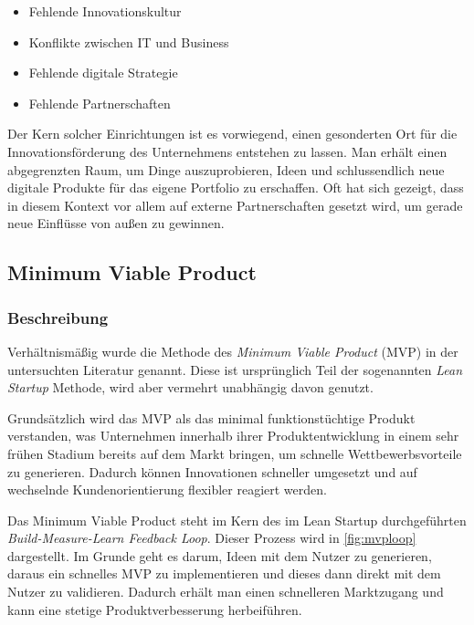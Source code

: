\begin{itemize}[noitemsep, topsep=0pt]
	\item Fehlende Innovationskultur
	\item Konflikte zwischen IT und Business
	\item Fehlende digitale Strategie
	\item Fehlende Partnerschaften
\end{itemize}

Der Kern solcher Einrichtungen ist es vorwiegend, einen gesonderten Ort für die Innovationsförderung des Unternehmens entstehen zu lassen. Man erhält einen abgegrenzten Raum, um Dinge auszuprobieren, Ideen und schlussendlich neue digitale Produkte für das eigene Portfolio zu erschaffen. Oft hat sich gezeigt, dass in diesem Kontext vor allem auf externe Partnerschaften gesetzt wird, um gerade neue Einflüsse von außen zu gewinnen. 

\subsection{Minimum Viable Product}

\subsubsection{Beschreibung}

Verhältnismäßig wurde die Methode des \textit{Minimum Viable Product} (MVP) in der untersuchten Literatur genannt. Diese ist ursprünglich Teil der sogenannten \textit{Lean Startup} Methode, wird aber vermehrt unabhängig davon genutzt.

Grundsätzlich wird das MVP als das minimal funktionstüchtige Produkt verstanden, was Unternehmen innerhalb ihrer Produktentwicklung in einem sehr frühen Stadium bereits auf dem Markt bringen, um schnelle Wettbewerbsvorteile zu generieren. Dadurch können Innovationen schneller umgesetzt und auf wechselnde Kundenorientierung flexibler reagiert werden. \cite{depiereux_minimum_2019}

Das Minimum Viable Product steht im Kern des im Lean Startup durchgeführten \textit{Build-Measure-Learn Feedback Loop}. Dieser Prozess wird in \ref{fig:mvploop} dargestellt. Im Grunde geht es darum, Ideen mit dem Nutzer zu generieren, daraus ein schnelles MVP zu implementieren und dieses dann direkt mit dem Nutzer zu validieren. Dadurch erhält man einen schnelleren Marktzugang und kann eine stetige Produktverbesserung herbeiführen. \cite[S. 102]{grote_fuhrungsinstrumente_2018}

